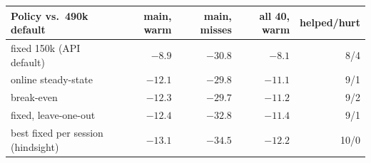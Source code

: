 \begin{tabular}{lrrrr}
\toprule
Policy vs.\ 490k default & main, warm & main, misses & all 40, warm & helped/hurt\\
\midrule
fixed 150k (API default) & $-8.9$ & $-30.8$ & $-8.1$ & 8/4\\
online steady-state & $-12.1$ & $-29.8$ & $-11.1$ & 9/1\\
break-even & $-12.3$ & $-29.7$ & $-11.2$ & 9/2\\
fixed, leave-one-out & $-12.4$ & $-32.8$ & $-11.4$ & 9/1\\
best fixed per session (hindsight) & $-13.1$ & $-34.5$ & $-12.2$ & 10/0\\
\bottomrule
\end{tabular}
